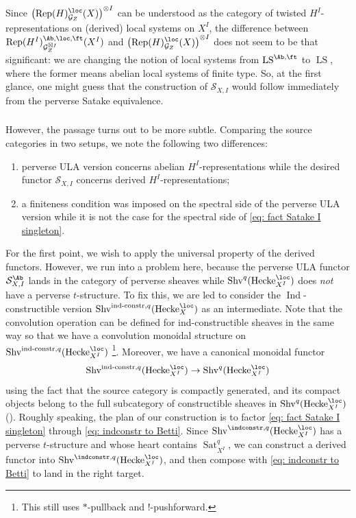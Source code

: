 \documentclass[10pt]{amsart}
\newcommand{\sssec}{\subsubsection}
\theoremstyle{remark}
\newcommand{\on}{\operatorname}
\newcommand{\cG}{\mathcal{G}}
\newcommand{\cS}{\mathcal{S}}
\newcommand{\Rep}{\on{Rep}}
\newcommand{\Shv}{\on{Shv}}
\newcommand{\LS}{\on{LS}}
\newcommand{\Sat}{\on{Sat}}
\DeclareMathOperator{\Ind}{Ind}
\newcommand{\Hecke}{\on{Hecke}}
\begin{document}
Since $\left(\Rep(H)^{\loc}_{\cG_Z}(X)\right)^{\otimes I}$ can be understood as the category of twisted $H^I$-representations on (derived) local systems on $X^I$, the difference between $\Rep(H^I)^{\Ab,\loc,\ft}_{\cG^{\boxtimes I}_Z}(X^I)$ and $\left(\Rep(H)^{\loc}_{\cG_Z}(X)\right)^{\otimes I}$ does not seem to be that significant: we are changing the notion of local systems from $\LS^{\Ab,\ft}$ to $\LS$, where the former means abelian local systems of finite type. So, at the first glance, one might guess that the construction  of $\cS_{X,I}$ would follow immediately from the perverse Satake equivalence.

\sssec{}\label{sssec: subtleties LS linear}
However, the passage turns out to be more subtle. Comparing the source categories in two setups, we note the following two differences:
\begin{enumerate}
    \item perverse ULA version concerns abelian $H^I$-representations while the desired functor $\cS_{X,I}$ concerns derived $H^I$-representations;
    \item a finiteness condition was imposed on the spectral side of the perverse ULA version while it is not the case for the spectral side of \eqref{eq: fact Satake I singleton}. 
\end{enumerate}

For the first point, we wish to apply the universal property of the derived functors. However, we run into a problem here, because the perverse ULA functor $\cS^{\Ab}_{X,I}$ lands in the category of perverse sheaves while $\Shv^q(\Hecke^{\loc}_{X^I})$ does \emph{not} have a perverse $t$-structure. To fix this, we are led to consider the $\Ind$-constructible version $\Shv^{\on{ind-constr},q}(\Hecke^{\loc}_X)$ as an intermediate. Note that the convolution operation can be defined for ind-constructible sheaves in the same way so that we have a convolution monoidal structure on $\Shv^{\on{ind-constr},q}(\Hecke^{\loc}_{X^I})$ \footnote{This still uses $*$-pullback and $!$-pushforward.}. Moreover, we have a canonical monoidal functor
\begin{equation}\label{eq: indconstr to Betti}
    \Shv^{\on{ind-constr},q}(\Hecke^{\loc}_{X^I})\rightarrow \Shv^{q}(\Hecke^{\loc}_{X^I})
\end{equation}
using the fact that the source category is compactly generated, and its compact objects belong to the full subcategory of constructible sheaves in $\Shv^q(\Hecke^{\loc}_{X^I})$ (\cite[Sect. F.1.1, Sect. F.2.2]{AGKRRV}). Roughly speaking, the plan of our construction is to factor \eqref{eq: fact Satake I singleton} through \eqref{eq: indconstr to Betti}. Since $\Shv^{\indconstr,q}(\Hecke^{\loc}_{X^I})$ has a perverse $t$-structure and whose heart contains $\Sat^{q}_{X^I}$, we can construct a derived functor into $\Shv^{\indconstr,q}(\Hecke^{\loc}_{X^I})$, and then compose with \eqref{eq: indconstr to Betti} to land in the right target.
\medskip
\end{document}
